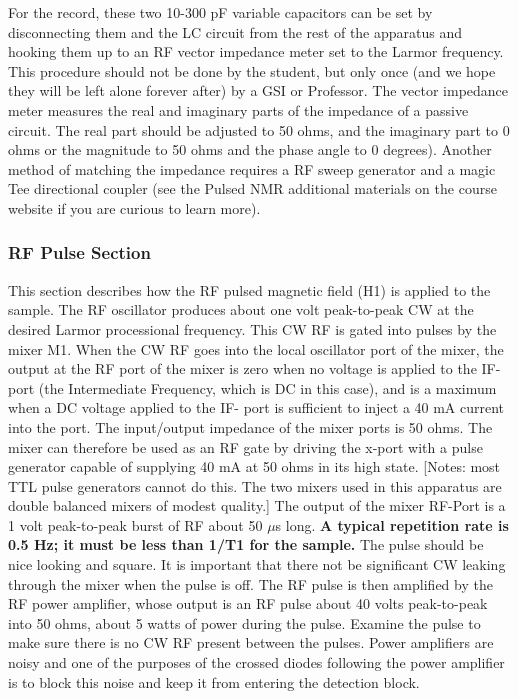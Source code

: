 \documentclass{../lab}
\begin{document}
For the record, these two 10-300 pF variable capacitors can be set by disconnecting them and the LC circuit from the rest of the apparatus and hooking them up to an RF vector impedance meter set to the Larmor frequency. This procedure should not be done by the student, but only once (and we hope they will be left alone forever after) by a GSI or Professor. The vector impedance meter measures the real and imaginary parts of the impedance of a passive circuit. The real part should be adjusted to 50 ohms, and the imaginary part to 0 ohms or the magnitude to 50 ohms and the phase angle to 0 degrees). Another method of matching the impedance requires a RF sweep generator and a magic Tee directional coupler (see the Pulsed NMR additional materials on the course website if you are curious to learn more).

\subsubsection{RF Pulse Section}

This section describes how the RF pulsed magnetic field (H1) is applied to the sample. The RF oscillator produces about one volt peak-to-peak CW at the desired Larmor processional frequency. This CW RF is gated into pulses by the mixer M1. When the CW RF goes into the local oscillator port of the mixer, the output at the RF port of the mixer is zero when no voltage is applied to the IF-port (the Intermediate Frequency, which is DC in this case), and is a maximum when a DC voltage applied to the IF- port is sufficient to inject a 40 mA current into the port. The input/output impedance of the mixer ports is 50 ohms. The mixer can therefore be used as an RF gate by driving the x-port with a pulse generator capable of supplying 40 mA at 50 ohms in its high state. [Notes: most TTL pulse generators cannot do this. The two mixers used in this apparatus are double balanced mixers of modest quality.] The output of the mixer RF-Port is a 1 volt peak-to-peak burst of RF about 50 $\mu$s long. \textbf{A typical repetition rate is 0.5 Hz; it must be less than 1/T1 for the sample.} The pulse should be nice looking and square. It is important that there not be significant CW leaking through the mixer when the pulse is off. The RF pulse is then amplified by the RF power amplifier, whose output is an RF pulse about 40 volts peak-to-peak into 50 ohms, about 5 watts of power during the pulse. Examine the pulse to make sure there is no CW RF present between the pulses. Power amplifiers are noisy and one of the purposes of the crossed diodes following the power amplifier is to block this noise and keep it from entering the detection block.
\end{document}
